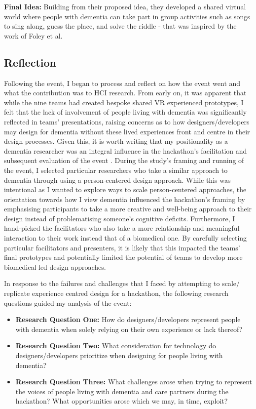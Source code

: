 \textbf{Final Idea:} Building from their proposed idea, they developed a shared virtual world where people with dementia can take part in group activities such as songs to sing along, guess the place, and solve the riddle - that was inspired by the work of Foley et al. \citep{foley_printer_2019}

\subsection{Reflection}
\label{sec:EventReflection}
Following the event, I began to process and reflect on how the event went and what the contribution was to HCI research. From early on, it was apparent that while the nine teams had created bespoke shared VR experienced prototypes, I felt that the lack of involvement of people living with dementia was significantly reflected in teams' presentations, raising concerns as to how designers/developers may design for dementia without these lived experiences front and centre in their design processes. Given this, it is worth writing that my positionality as a dementia researcher was an integral influence in the hackathon's facilitation and subsequent evaluation of the event \citep{bourke_positionality_2014}. During the study's framing and running of the event, I selected particular researchers who take a similar approach to dementia through using a person-centered design approach. While this was intentional as I wanted to explore ways to scale person-centered approaches, the orientation towards how I view dementia influenced the hackathon's framing by emphasising participants to take a more creative and well-being approach to their design instead of problematising someone's cognitive deficits. Furthermore, I hand-picked the facilitators who also take a more relationship and meaningful interaction to their work instead that of a biomedical one. By carefully selecting particular facilitators and presenters, it is likely that this impacted the teams' final prototypes and potentially limited the potential of teams to develop more biomedical led design approaches. 

In response to the failures and challenges that I faced by attempting to scale/ replicate experience centred design for a hackathon, the following research questions guided my analysis of the event:

\begin{itemize}
    \item \textbf{Research Question One:} How do designers/developers represent people with dementia when solely relying on their own experience or lack thereof?
    \item \textbf{Research Question Two:} What consideration for technology do designers/developers prioritize when designing for people living with dementia?
    \item \textbf{Research Question Three:} What challenges arose when trying to represent the voices of people living with dementia and care partners during the hackathon? What opportunities arose which we may, in time, exploit?
\end{itemize}

